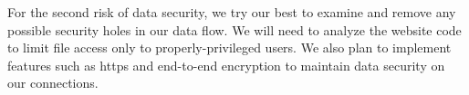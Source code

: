For the second risk of data security, we try our best to examine and remove any possible security holes in our data flow.
We will need to analyze the website code to limit file access only to properly-privileged users. 
We also plan to implement features such as https and end-to-end encryption to maintain data security on our connections.